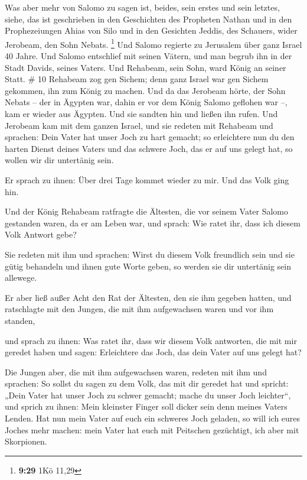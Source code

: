  Was aber mehr von Salomo zu sagen ist, beides, sein erstes
und sein letztes, siehe, das ist geschrieben in den Geschichten des
Propheten Nathan und in den Prophezeiungen Ahias von Silo und in den
Gesichten Jeddis, des Schauers, wider Jerobeam, den Sohn Nebats.
\footnote{\textbf{9:29} 1Kö 11,29}  Und Salomo regierte zu
Jerusalem über ganz Israel 40 Jahre.  Und Salomo entschlief
mit seinen Vätern, und man begrub ihn in der Stadt Davids, seines
Vaters. Und Rehabeam, sein Sohn, ward König an seiner Statt. \# 10
 Rehabeam zog gen Sichem; denn ganz Israel war gen Sichem
gekommen, ihn zum König zu machen.  Und da das Jerobeam
hörte, der Sohn Nebats -- der in Ägypten war, dahin er vor dem König
Salomo geflohen war --, kam er wieder aus Ägypten.  Und sie
sandten hin und ließen ihn rufen. Und Jerobeam kam mit dem ganzen
Israel, und sie redeten mit Rehabeam und sprachen:  Dein
Vater hat unser Joch zu hart gemacht; so erleichtere nun du den harten
Dienst deines Vaters und das schwere Joch, das er auf uns gelegt hat, so
wollen wir dir untertänig sein.

 Er sprach zu ihnen: Über drei Tage kommet wieder zu mir.
Und das Volk ging hin.

 Und der König Rehabeam ratfragte die Ältesten, die vor
seinem Vater Salomo gestanden waren, da er am Leben war, und sprach: Wie
ratet ihr, dass ich diesem Volk Antwort gebe?

 Sie redeten mit ihm und sprachen: Wirst du diesem Volk
freundlich sein und sie gütig behandeln und ihnen gute Worte geben, so
werden sie dir untertänig sein allewege.

 Er aber ließ außer Acht den Rat der Ältesten, den sie ihm
gegeben hatten, und ratschlagte mit den Jungen, die mit ihm aufgewachsen
waren und vor ihm standen,

 und sprach zu ihnen: Was ratet ihr, dass wir diesem Volk
antworten, die mit mir geredet haben und sagen: Erleichtere das Joch,
das dein Vater auf uns gelegt hat?

 Die Jungen aber, die mit ihm aufgewachsen waren, redeten
mit ihm und sprachen: So sollst du sagen zu dem Volk, das mit dir
geredet hat und spricht: „Dein Vater hat unser Joch zu schwer gemacht;
mache du unser Joch leichter``, und sprich zu ihnen: Mein kleinster
Finger soll dicker sein denn meines Vaters Lenden.  Hat nun
mein Vater auf euch ein schweres Joch geladen, so will ich eures Joches
mehr machen: mein Vater hat euch mit Peitschen gezüchtigt, ich aber mit
Skorpionen.

